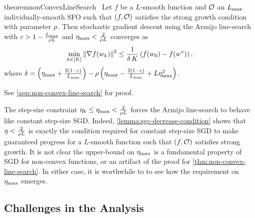 \begin{restatable}{theorem}{nonConvexLineSearch}~\label{thm:non-convex-line-search}
    Let \( f \) be a \( L \)-smooth function and \( \oracle{} \) an \( \Lmax \) individually-smooth \ac{SFO} such that \( \rbr{f, \oracle{}} \) satisfies the strong growth condition with parameter \( \sgc \).
    Then stochastic gradient descent using the Armijo line-search with \( c >  1 - \frac{\Lmax}{\sgc L}\) and \( \etamax <  \frac{2}{\sgc L} \) converges as
    \[ \min_{k \in [K]} \norm{\grad(\wk)}^2 \leq \frac{1}{\delta \, K} \rbr{f(w_0) - f(\wopt)}, \]
    where \( \delta = \rbr{\etamax + \frac{2(1-c)}{\Lmax}} - \sgc \rbr{\etamax - \frac{2(1-c)}{\Lmax} + L \etamax^2} \).
\end{restatable}
\noindent See \autoref{app:non-convex-line-search} for proof. \hfill \break 

The step-size constraint \( \etak \leq \etamax < \frac{2}{\sgc L} \) forces the Armijo line-search to behave like constant step-size \ac{SGD}.
Indeed, \autoref{lemma:sgc-decrease-condition} shows that \( \eta < \frac{2}{\sgc L} \) is exactly the condition required for constant step-size \ac{SGD} to make guaranteed progress for a \( L \)-smooth function such that \( \rbr{f, \oracle{}} \) satisfies strong growth.
It is not clear the upper-bound on \( \etamax \) is a fundamental property of \ac{SGD} for non-convex functions, or an artifact of the proof for \autoref{thm:non-convex-line-search}. 
In either case, it is worthwhile to to see how the requirement on \( \etamax \) emerges.

\subsection{Challenges in the Analysis}\label{sec:ls-nc-challenges}

